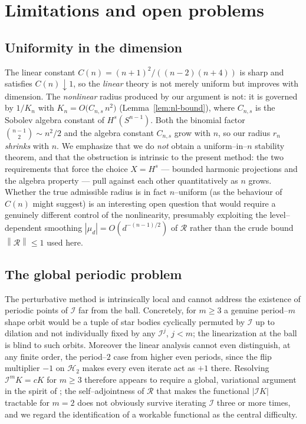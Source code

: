 \documentclass[10pt,a4paper]{amsart}
\newcommand{\Sph}{S^{n-1}}
\newcommand{\Rad}{\mathcal{R}}
\newcommand{\IB}{\mathcal{I}}
\newcommand{\Hd}[1]{\mathcal{H}_{#1}}
\newcommand{\norm}[1]{\left\lVert #1 \right\rVert}
\newcommand{\abs}[1]{\left\lvert #1 \right\rvert}
\begin{document}
\section{Limitations and open problems}\label{sec:open}

\subsection{Uniformity in the dimension}
The linear constant $C(n)=(n+1)^2/((n-2)(n+4))$ is sharp and satisfies
$C(n)\downarrow1$, so the \emph{linear} theory is not merely uniform but
improves with dimension. The \emph{nonlinear} radius produced by our argument
is not: it is governed by $1/K_n$ with $K_n=O\big(C_{n,s}\,n^2\big)$
(Lemma~\ref{lem:nl-bound}), where $C_{n,s}$ is the Sobolev algebra constant of
$H^s(\Sph)$. Both the binomial factor $\binom{n-1}{2}\sim n^2/2$ and the
algebra constant $C_{n,s}$ grow with $n$, so our radius $r_n$ \emph{shrinks}
with $n$. We emphasize that we do \emph{not} obtain a uniform--in--$n$ stability
theorem, and that the obstruction is intrinsic to the present method: the two
requirements that force the choice $X=H^s$ --- bounded harmonic projections and
the algebra property --- pull against each other quantitatively as $n$ grows.
Whether the true admissible radius is in fact $n$--uniform (as the behaviour of
$C(n)$ might suggest) is an interesting open question that would require a
genuinely different control of the nonlinearity, presumably exploiting the
level--dependent smoothing $\abs{\mu_d}=O(d^{-(n-1)/2})$ of $\Rad$ rather than
the crude bound $\norm{\Rad}\le1$ used here.

\subsection{The global periodic problem}
The perturbative method is intrinsically local and cannot address the existence
of periodic points of $\IB$ far from the ball. Concretely, for $m\ge3$ a
genuine period--$m$ shape orbit would be a tuple of star bodies cyclically
permuted by $\IB$ up to dilation and not individually fixed by any $\IB^j$,
$j<m$; the linearization at the ball is blind to such orbits. Moreover the
linear analysis cannot even distinguish, at any finite order, the period--$2$
case from higher even periods, since the flip multiplier $-1$ on $\Hd2$ makes
every even iterate act as $+1$ there. Resolving $\IB^mK=cK$ for $m\ge3$
therefore appears to require a global, variational argument in the spirit of
\cite{MSY2025}; the self--adjointness of $\Rad$ that makes the functional
$\abs{\IB K}$ tractable for $m=2$ does not obviously survive iterating $\IB$
three or more times, and we regard the identification of a workable functional
as the central difficulty.
\end{document}
